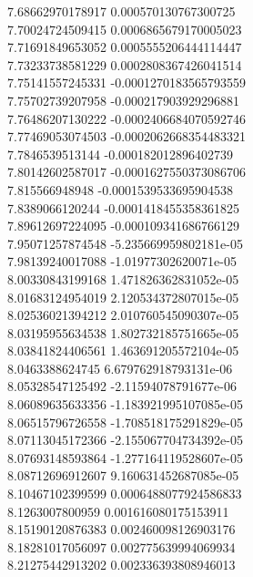{7.68662970178917 0.000570130767300725 \\
7.70024724509415 0.0006865679170005023 \\
7.71691849653052 0.0005555206444114447 \\
7.73233738581229 0.0002808367426041514 \\
7.75141557245331 -0.0001270183565793559 \\
7.75702739207958 -0.000217903929296881 \\
7.76486207130222 -0.0002406684070592746 \\
7.77469053074503 -0.0002062668354483321 \\
7.7846539513144 -0.000182012896402739 \\
7.80142602587017 -0.0001627550373086706 \\
7.815566948948 -0.0001539533695904538 \\
7.8389066120244 -0.0001418455358361825 \\
7.89612697224095 -0.000109341686766129 \\
7.95071257874548 -5.235669959802181e-05 \\
7.98139240017088 -1.01977302620071e-05 \\
8.00330843199168 1.471826362831052e-05 \\
8.01683124954019 2.120534372807015e-05 \\
8.02536021394212 2.010760545090307e-05 \\
8.03195955634538 1.802732185751665e-05 \\
8.03841824406561 1.463691205572104e-05 \\
8.0463388624745 6.679762918793131e-06 \\
8.05328547125492 -2.11594078791677e-06 \\
8.06089635633356 -1.183921995107085e-05 \\
8.06515796726558 -1.708518175291829e-05 \\
8.07113045172366 -2.155067704734392e-05 \\
8.07693148593864 -1.277164119528607e-05 \\
8.08712696912607 9.160631452687085e-05 \\
8.10467102399599 0.0006488077924586833 \\
8.1263007800959 0.001616080175153911 \\
8.15190120876383 0.002460098126903176 \\
8.18281017056097 0.002775639994069934 \\
8.21275442913202 0.002336393808946013 \\
}
